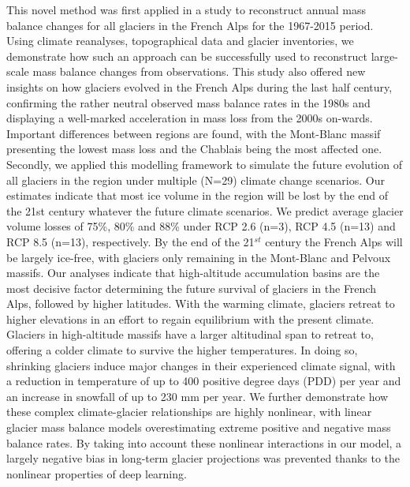 This novel method was first applied in a study to reconstruct annual mass balance changes for all glaciers in the French Alps for the 1967-2015 period. Using climate reanalyses, topographical data and glacier inventories, we demonstrate how such an approach can be successfully used to reconstruct large-scale mass balance changes from observations. This study also offered new insights on how glaciers evolved in the French Alps during the last half century, confirming the rather neutral observed mass balance rates in the 1980s and displaying a well-marked acceleration in mass loss from the 2000s on-wards. Important differences between regions are found, with the Mont-Blanc massif presenting the lowest mass loss and the Chablais being the most affected one. Secondly, we applied this modelling framework to simulate the future evolution of all glaciers in the region under multiple (N=29) climate change scenarios. Our estimates indicate that most ice volume in the region will be lost by the end of the 21st century whatever the future climate scenarios. We predict average glacier volume losses of 75\%, 80\% and 88\% under RCP 2.6 (n=3), RCP 4.5 (n=13) and RCP 8.5 (n=13), respectively. By the end of the 21$^{st}$ century the French Alps will be largely ice-free, with glaciers only remaining in the Mont-Blanc and Pelvoux massifs. Our analyses indicate that high-altitude accumulation basins are the most decisive factor determining the future survival of glaciers in the French Alps, followed by higher latitudes. With the warming climate, glaciers retreat to higher elevations in an effort to regain equilibrium with the present climate. Glaciers in high-altitude massifs have a larger altitudinal span to retreat to, offering a colder climate to survive the higher temperatures. In doing so, shrinking glaciers induce major changes in their experienced climate signal, with a reduction in temperature of up to 400 positive degree days (PDD) per year and an increase in snowfall of up to 230 mm per year. We further demonstrate how these complex climate-glacier relationships are highly nonlinear, with linear glacier mass balance models overestimating extreme positive and negative mass balance rates. By taking into account these nonlinear interactions in our model, a largely negative bias in long-term glacier projections was prevented thanks to the nonlinear properties of deep learning. 

